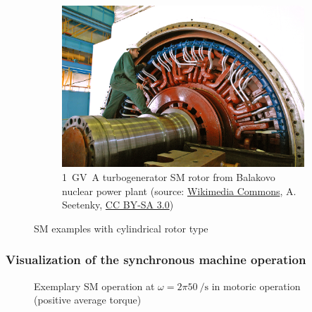 \begin{frame}
\begin{figure}
\begin{subfigure}{0.49\textwidth}
			\includegraphics[height=0.55\textheight]{fig/lec07/Turbogenerator_rotor.jpg}
			\caption{\SI[tight-spacing=true]{1}{\giga\volt\ampere} turbogenerator SM rotor from Balakovo nuclear power plant (source: \href{https://commons.wikimedia.org/wiki/File:BalakovoNPP_tb.jpg}{Wikimedia Commons},  A. Seetenky, \href{https://creativecommons.org/licenses/by-sa/3.0/deed}{CC BY-SA 3.0})} 
		\end{subfigure}
        \caption{SM examples with cylindrical rotor type} 
        \label{fig:examples_SM_applications_02}
	\end{figure}
\end{frame}

\begin{frame}
	\frametitle{Visualization of the synchronous machine operation}
    \vspace{-0.275cm}
    \begin{figure}
        \centering
        \vspace{-0.25cm}
        \caption{Exemplary SM operation at $\omega=2 \pi \SI{50}{\per\second}$ in motoric operation (positive average torque)}
        \label{fig:SM_load_angle_90_animation}
    \end{figure}
\end{frame}

